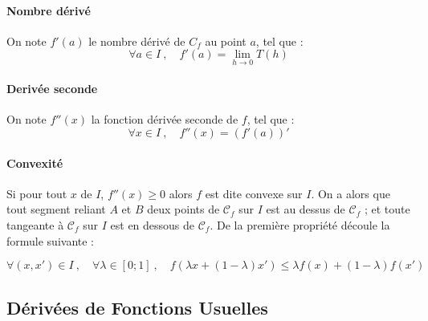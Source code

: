 \documentclass{report}
\newcommand{\Cf}{\mathcal{C}_f}
\begin{document}
    \paragraph{Nombre dérivé}

    On note $f'(a)$ le nombre dérivé de $C_f$ au point $a$, tel que :
    \[ \forall a \in I ~ , \quad f'(a) = \lim_{h \to 0} T(h) \]

    \paragraph{Derivée seconde}

      On note $f''(x)$ la fonction dérivée seconde de $f$, tel que :
      \[ \forall x \in I ~ , \quad f''(x) = \left(f'(a)\right)' \]

    \paragraph{Convexité} Si pour tout $x$ de $I$, $f''(x)\ge 0$ alors $f$ est dite convexe sur $I$. On a alors que tout segment reliant $A$ et $B$ deux points de $\Cf$ sur $I$ est au dessus de $\Cf$ ; et toute tangeante à $\Cf$ sur $I$ est en dessous de $\Cf$. De la première propriété découle la formule suivante :

    \[\forall (x, x')\in I ~, \quad \forall \lambda \in \left[0;1\right] ~ , \quad f(\lambda x + (1 - \lambda)x') \le \lambda f(x) + (1-\lambda)f(x'   )\]

    \subsection{Dérivées de Fonctions Usuelles}
\end{document}
